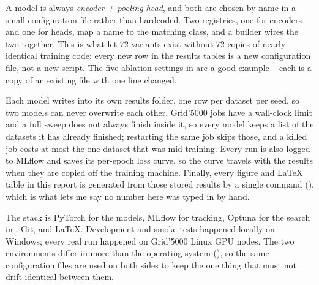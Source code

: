 A model is always \emph{encoder + pooling head}, and both are chosen by name in a small
configuration file rather than hardcoded. Two registries, one for encoders and one for heads, map a
name to the matching class, and a builder wires the two together. This is what let 72 variants exist
without 72 copies of nearly identical training code: every new row in the results tables is a new
configuration file, not a new script. The five ablation settings in  are a good
example -- each is a copy of an existing file with one line changed.

Each model writes into its own results folder, one row per dataset per seed, so two models can never
overwrite each other. Grid'5000 jobs have a wall-clock limit and a full sweep does not always finish
inside it, so every model keeps a list of the datasets it has already finished; restarting the same
job skips those, and a killed job costs at most the one dataset that was mid-training. Every run is
also logged to MLflow and saves its per-epoch loss curve, so the curve travels with the results when
they are copied off the training machine. Finally, every figure and \LaTeX{} table in this report is
generated from those stored results by a single command (), which is what lets me
say no number here was typed in by hand.

The stack is PyTorch \citep{paszke2019pytorch} for the models, MLflow for tracking, Optuna
\citep{akiba2019optuna} for the search in , Git, and \LaTeX{}. Development and smoke
tests happened locally on Windows; every real run happened on Grid'5000 Linux GPU nodes. The two
environments differ in more than the operating system (), so the same configuration
files are used on both sides to keep the one thing that must not drift identical between them.
